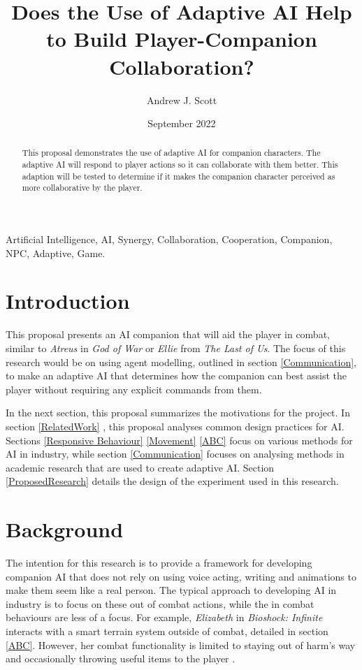 \documentclass{IEEEtran}
\title{Does the Use of Adaptive AI Help to Build Player-Companion Collaboration?}
\author{Andrew J. Scott}
\date{September 2022}
\begin{document}
	\maketitle

\begin{abstract}
This proposal demonstrates the use of adaptive AI for companion characters. The adaptive AI will respond to player actions so it can collaborate with them better. This adaption will be tested to determine if it makes the companion character perceived as more collaborative by the player.
\end{abstract}

 \begin{IEEEkeywords}
Artificial Intelligence, AI, Synergy, Collaboration, Cooperation, Companion, NPC, Adaptive, Game.
\end{IEEEkeywords}

\section{Introduction}
\label{Intro}

This proposal presents an AI companion that will aid the player in combat, similar to \textit{Atreus} in \textit{God of War} or \textit{Ellie} from \textit{The Last of Us}. The focus of this research would be on using agent modelling, outlined in section \ref{Communication}, to make an adaptive AI that determines how the companion can best assist the player without requiring any explicit commands from them.

In the next section, this proposal summarizes the motivations for the project. In section \ref{RelatedWork} , this proposal analyses common design practices for AI. Sections \ref{Responsive Behaviour} \ref{Movement} \ref{ABC} focus on various methods for AI in industry, while section \ref{Communication} focuses on analysing methods in academic research that are used to create adaptive AI. Section \ref{ProposedResearch} details the design of the experiment used in this research.

\section{Background}
\label{Background}

The intention for this research is to provide a framework for developing companion AI that does not rely on using voice acting, writing and animations to make them seem like a real person. The typical approach to developing AI in industry is to focus on these out of combat actions, while the in combat behaviours are less of a focus. For example, \textit{Elizabeth} in \textit{Bioshock: Infinite} interacts with a smart terrain system outside of combat, detailed in section \ref{ABC}. However, her combat functionality is limited to staying out of harm's way and occasionally throwing useful items to the player \cite{GDCElizabeth}.
\end{document}
